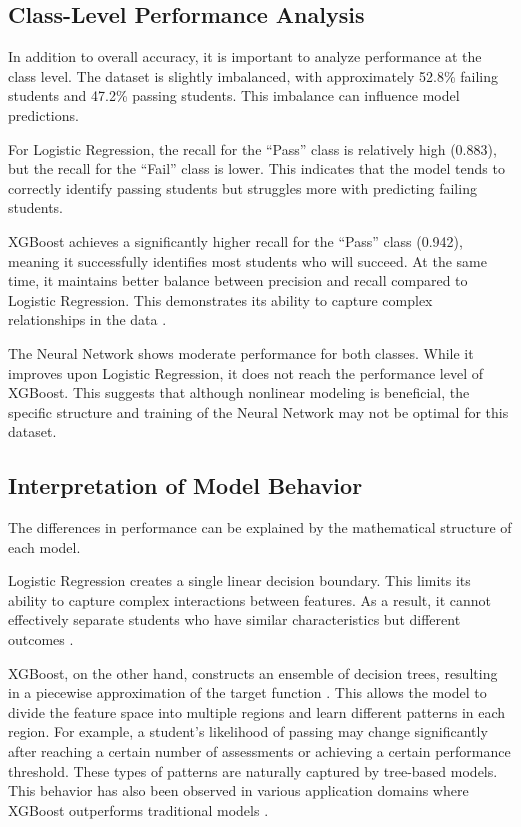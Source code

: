 \documentclass[conference]{IEEEtran}
\begin{document}
\subsection{Class-Level Performance Analysis}

In addition to overall accuracy, it is important to analyze performance at the class level. The dataset is slightly imbalanced, with approximately 52.8\% failing students and 47.2\% passing students. This imbalance can influence model predictions.

For Logistic Regression, the recall for the ``Pass'' class is relatively high (0.883), but the recall for the ``Fail'' class is lower. This indicates that the model tends to correctly identify passing students but struggles more with predicting failing students.

XGBoost achieves a significantly higher recall for the ``Pass'' class (0.942), meaning it successfully identifies most students who will succeed. At the same time, it maintains better balance between precision and recall compared to Logistic Regression. This demonstrates its ability to capture complex relationships in the data \cite{ki2026}.

The Neural Network shows moderate performance for both classes. While it improves upon Logistic Regression, it does not reach the performance level of XGBoost. This suggests that although nonlinear modeling is beneficial, the specific structure and training of the Neural Network may not be optimal for this dataset.

\subsection{Interpretation of Model Behavior}

The differences in performance can be explained by the mathematical structure of each model.

Logistic Regression creates a single linear decision boundary. This limits its ability to capture complex interactions between features. As a result, it cannot effectively separate students who have similar characteristics but different outcomes \cite{pesantez2019, churn2023}.

XGBoost, on the other hand, constructs an ensemble of decision trees, resulting in a piecewise approximation of the target function \cite{ki2026}. This allows the model to divide the feature space into multiple regions and learn different patterns in each region. For example, a student's likelihood of passing may change significantly after reaching a certain number of assessments or achieving a certain performance threshold. These types of patterns are naturally captured by tree-based models. This behavior has also been observed in various application domains where XGBoost outperforms traditional models \cite{elarifi2026, chukwuemeka2026}.
\end{document}
